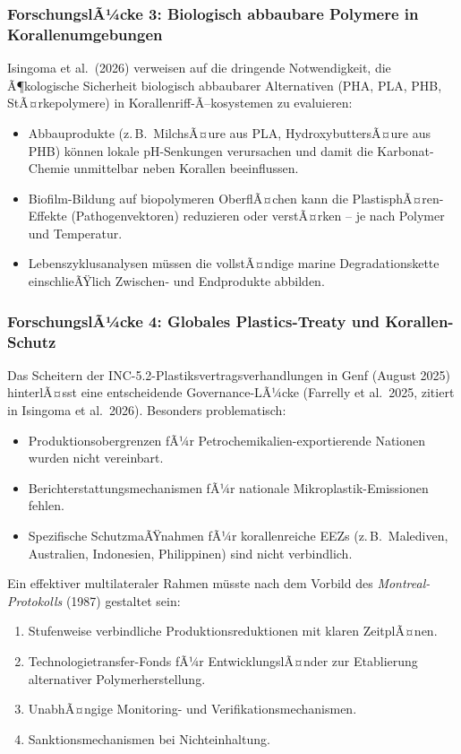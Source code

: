 ﻿\documentclass[12pt,a4paper]{article}
\theoremstyle{definition}
\theoremstyle{remark}
\newcommand{\MP}{Mikroplastik}
\begin{document}
\subsubsection{ForschungslÃ¼cke 3: Biologisch abbaubare Polymere in Korallenumgebungen}

Isingoma et al.\ (2026) verweisen auf die dringende Notwendigkeit, die
Ã¶kologische Sicherheit biologisch abbaubarer Alternativen (PHA, PLA, PHB,
StÃ¤rkepolymere) in Korallenriff-Ã–kosystemen zu evaluieren:
\begin{itemize}[noitemsep, leftmargin=*]
  \item Abbauprodukte (z.\,B.\ MilchsÃ¤ure aus PLA, HydroxybuttersÃ¤ure aus PHB)
    k\"onnen lokale pH-Senkungen verursachen und damit die Karbonat-Chemie
    unmittelbar neben Korallen beeinflussen.
  \item Biofilm-Bildung auf biopolymeren OberflÃ¤chen kann die
    PlastisphÃ¤ren-Effekte (Pathogenvektoren) reduzieren oder verstÃ¤rken --
    je nach Polymer und Temperatur.
  \item Lebenszyklusanalysen m\"ussen die vollstÃ¤ndige marine Degradationskette
    einschlieÃŸlich Zwischen- und Endprodukte abbilden.
\end{itemize}

\subsubsection{ForschungslÃ¼cke 4: Globales Plastics-Treaty und Korallen-Schutz}

Das Scheitern der INC-5.2-Plastiksvertragsverhandlungen in Genf (August 2025)
hinterlÃ¤sst eine entscheidende Governance-LÃ¼cke (Farrelly et al.\ 2025,
zitiert in Isingoma et al.\ 2026). Besonders problematisch:
\begin{itemize}[noitemsep, leftmargin=*]
  \item Produktionsobergrenzen fÃ¼r Petrochemikalien-exportierende Nationen
    wurden nicht vereinbart.
  \item Berichterstattungsmechanismen fÃ¼r nationale \MP{}-Emissionen fehlen.
  \item Spezifische SchutzmaÃŸnahmen fÃ¼r korallenreiche EEZs (z.\,B.\
    Malediven, Australien, Indonesien, Philippinen) sind nicht verbindlich.
\end{itemize}

Ein effektiver multilateraler Rahmen m\"usste nach dem Vorbild des
\textit{Montreal-Protokolls} (1987) gestaltet sein:
\begin{enumerate}[noitemsep, leftmargin=*]
  \item Stufenweise verbindliche Produktionsreduktionen mit klaren ZeitplÃ¤nen.
  \item Technologietransfer-Fonds fÃ¼r EntwicklungslÃ¤nder zur Etablierung
    alternativer Polymerherstellung.
  \item UnabhÃ¤ngige Monitoring- und Verifikationsmechanismen.
  \item Sanktionsmechanismen bei Nichteinhaltung.
\end{enumerate}
\end{document}
